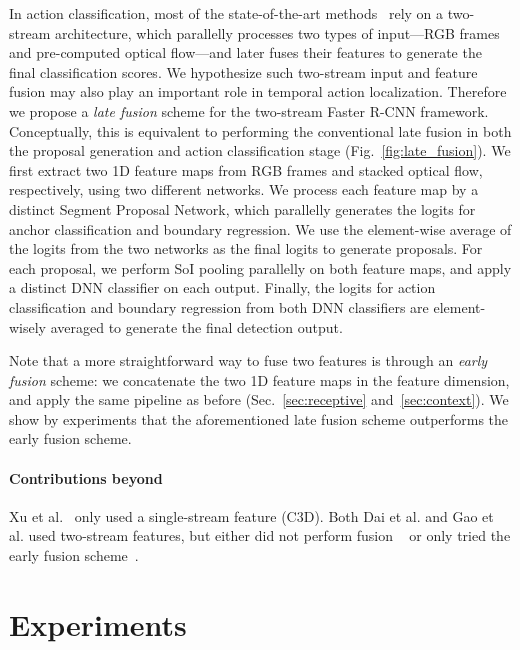 \documentclass[10pt,twocolumn,letterpaper]{article}
\begin{document}
In action classification, most of the state-of-the-art
methods~\cite{simonyan:nips2014,ng:cvpr2015,wang:eccv2016,carreira:cvpr2017,feichtenhofer:cvpr2017}
rely on a two-stream architecture, which parallelly processes two types of
input---RGB frames and pre-computed optical flow---and later fuses their
features to generate the final classification scores. We hypothesize such
two-stream input and feature fusion may also play an important role in temporal
action localization. Therefore we propose a \textit{late fusion} scheme for the
two-stream Faster R-CNN framework. Conceptually, this is equivalent to
performing the conventional late fusion in both the proposal generation and
action classification stage (Fig.~\ref{fig:late_fusion}). We first extract two
1D feature maps from RGB frames and stacked optical flow, respectively, using
two different networks. We process each feature map by a distinct Segment
Proposal Network, which parallelly generates the logits for anchor
classification and boundary regression. We use the element-wise average of the
logits from the two networks as the final logits to generate proposals. For
each proposal, we perform SoI pooling parallelly on both feature maps, and
apply a distinct DNN classifier on each output. Finally, the logits for action
classification and boundary regression from both DNN classifiers are
element-wisely averaged to generate the final detection output.

Note that a more straightforward way to fuse two features is through an
\textit{early fusion} scheme: we concatenate the two 1D feature maps in the
feature dimension, and apply the same pipeline as before
(Sec.~\ref{sec:receptive} and~\ref{sec:context}). We show by experiments that
the aforementioned late fusion scheme outperforms the early fusion scheme.

\vspace{-3mm}

\paragraph{Contributions
beyond~\cite{dai:iccv2017,gao:bmvc2017,gao:iccv2017,xu:iccv2017}} Xu et
al.~\cite{xu:iccv2017} only used a single-stream feature (C3D). Both Dai et al.
and Gao et al. used two-stream features, but either did not perform fusion
~\cite{gao:iccv2017} or only tried the early fusion
scheme~\cite{dai:iccv2017,gao:bmvc2017}.

\section{Experiments}
\end{document}
